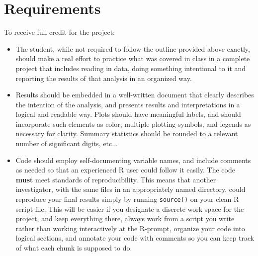 \documentclass[11pt]{article}
\begin{document}
\section*{Requirements}   
To receive full credit for the project:
\begin{itemize}  
\item The student, while not required to follow the outline provided above exactly, should make a real effort to practice what was covered in class in a complete project that includes reading in data, doing something intentional to it and reporting the results of that analysis in an organized way. 
\item Results should be embedded in a well-written document that clearly describes the intention of the analysis, and presents results and interpretations in a logical and readable way.  Plots should have meaningful labels, and should incorporate such elements as color, multiple plotting symbols, and legends as necessary for  clarity.  Summary statistics should be rounded to a relevant number of significant digits, etc...
\item Code should employ self-documenting variable names, and include  comments as needed so that an experienced R user could follow it easily.  The code {\bf must} meet standards of reproducibility. This means that another investigator, with the same files in an appropriately named directory, could reproduce your final results simply by running {\tt source()} on your clean R script file.  This will be easier if you designate a discrete work space for the project, and keep everything there, always work from a script you write rather than working interactively at the R-prompt, organize your code into logical sections, and  annotate your code with comments so you can keep track of what each chunk is supposed to do.   
\end{itemize}
\end{document}
